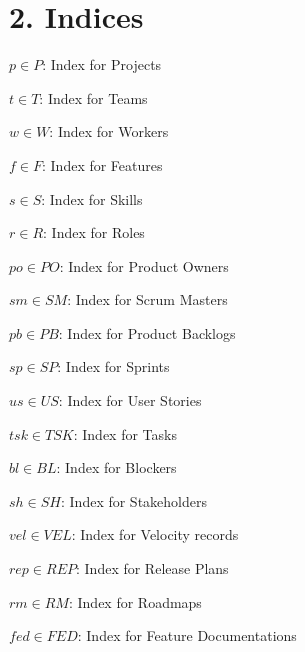 \documentclass[12pt]{article}
\begin{document}
\section{2. Indices}
\item $p \in P$: Index for Projects
    \item $t \in T$: Index for Teams
    \item $w \in W$: Index for Workers
    \item $f \in F$: Index for Features
    \item $s \in S$: Index for Skills
    \item $r \in R$: Index for Roles
    \item $po \in PO$: Index for Product Owners
    \item $sm \in SM$: Index for Scrum Masters
    \item $pb \in PB$: Index for Product Backlogs
    \item $sp \in SP$: Index for Sprints
    \item $us \in US$: Index for User Stories
    \item $tsk \in TSK$: Index for Tasks
    \item $bl \in BL$: Index for Blockers
    \item $sh \in SH$: Index for Stakeholders
    \item $vel \in VEL$: Index for Velocity records
    \item $rep \in REP$: Index for Release Plans
    \item $rm \in RM$: Index for Roadmaps
    \item $fed \in FED$: Index for Feature Documentations
\end{document}
